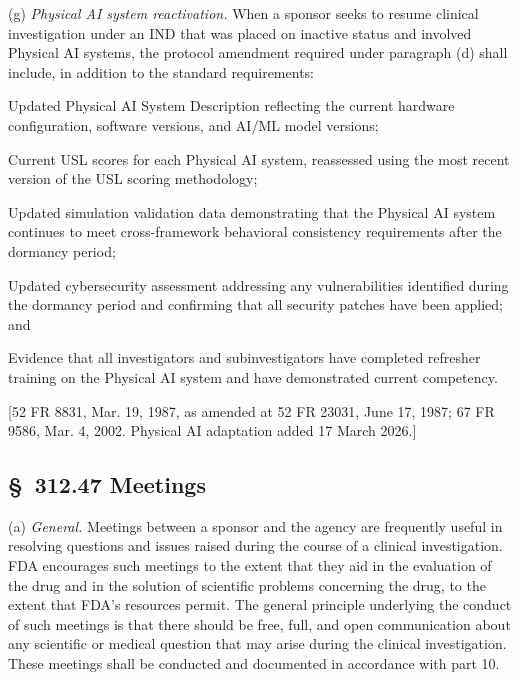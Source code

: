 (g) \textit{Physical AI system reactivation.} When a sponsor seeks to resume clinical investigation under an IND that was placed on inactive status and involved Physical AI systems, the protocol amendment required under paragraph (d) shall include, in addition to the standard requirements:

\begin{description}[leftmargin=0.8cm,style=sameline]
\item[(i)] Updated Physical AI System Description reflecting the current hardware configuration, software versions, and AI/ML model versions;
\item[(ii)] Current USL scores for each Physical AI system, reassessed using the most recent version of the USL scoring methodology;
\item[(iii)] Updated simulation validation data demonstrating that the Physical AI system continues to meet cross-framework behavioral consistency requirements after the dormancy period;
\item[(iv)] Updated cybersecurity assessment addressing any vulnerabilities identified during the dormancy period and confirming that all security patches have been applied; and
\item[(v)] Evidence that all investigators and subinvestigators have completed refresher training on the Physical AI system and have demonstrated current competency.
\end{description}

[52 FR 8831, Mar. 19, 1987, as amended at 52 FR 23031, June 17, 1987; 67 FR 9586, Mar. 4, 2002. Physical AI adaptation added 17 March 2026.]

\subsection{\S~312.47 Meetings}

(a) \textit{General.} Meetings between a sponsor and the agency are frequently useful in resolving questions and issues raised during the course of a clinical investigation. FDA encourages such meetings to the extent that they aid in the evaluation of the drug and in the solution of scientific problems concerning the drug, to the extent that FDA's resources permit. The general principle underlying the conduct of such meetings is that there should be free, full, and open communication about any scientific or medical question that may arise during the clinical investigation. These meetings shall be conducted and documented in accordance with part 10.

